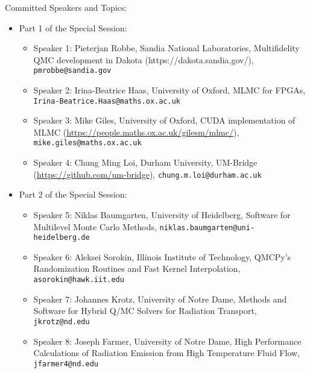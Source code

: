 \begin{talk}
Committed Speakers and Topics:
\begin{itemize}
\item Part 1 of the Special Session:
\begin{itemize}
    \item Speaker 1: Pieterjan Robbe, Sandia National Laboratories, Multifidelity QMC development in Dakota (https://dakota.sandia.gov/), \texttt{pmrobbe@sandia.gov}
    \item Speaker 2: Irina-Beatrice Haas, University of Oxford,  MLMC for FPGAs, \newline \texttt{Irina-Beatrice.Haas@maths.ox.ac.uk} 
    \item Speaker 3: Mike Giles, University of Oxford, CUDA implementation of MLMC (\url{https://people.maths.ox.ac.uk/gilesm/mlmc/}), \texttt{mike.giles@maths.ox.ac.uk}
    \item Speaker 4: Chung Ming Loi,  Durham University, UM-Bridge (\url{https://github.com/um-bridge}), \texttt{chung.m.loi@durham.ac.uk} %
\end{itemize}
\item Part 2 of the Special Session:
\begin{itemize}
    \item Speaker 5:  Niklas Baumgarten, University of Heidelberg, Software for Multilevel Monte Carlo Methods, \texttt{niklas.baumgarten@uni-heidelberg.de}
    \item Speaker 6: Aleksei Sorokin,  Illinois Institute of Technology, QMCPy's Randomization Routines and Fast Kernel Interpolation, \texttt{asorokin@hawk.iit.edu}
    \item Speaker 7:  Johannes Krotz, University of Notre Dame, Methods and Software for Hybrid Q/MC Solvers for Radiation Transport, \texttt{jkrotz@nd.edu} %
    \item Speaker 8: Joseph Farmer, University of Notre Dame, High Performance Calculations of Radiation Emission from High Temperature Fluid Flow, \texttt{jfarmer4@nd.edu} %

\end{itemize}
\end{itemize}


\medskip
\begin{comment}
If you would like to include references, please do so by creating a simple list numbered by [1], [2], [3], \ldots. See example below.
Please do not use the \texttt{bibliography} environment or \texttt{bibtex} files.
\begin{enumerate}
	\item[{[1]}] Niederreiter, Harald (1992). {\it Random number generation and quasi-Monte Carlo methods}. Society for Industrial and Applied Mathematics (SIAM).
	\item[{[2]}] Roberts, Gareth O, \& Rosenthal, Jeffrey S. (2002).  Optimal scaling for various Metropolis-Hastings algorithms, \textbf{16}(4), 351--367.
\end{enumerate}


\end{comment}
\end{talk}
